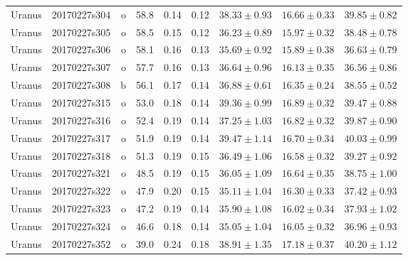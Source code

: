 \begin{table}
\begin{tabular}{|l|l|r|c|c|c|c|c|c|}
 Uranus   & 20170227s304 & o &  58.8 & 0.14 & 0.12 & $     38.33 \pm        0.93$  & $     16.66 \pm        0.33$ & $     39.85 \pm       0.82$  \\
 Uranus   & 20170227s305 & o &  58.5 & 0.15 & 0.12 & $     36.23 \pm        0.89$  & $     15.97 \pm        0.32$ & $     38.48 \pm       0.78$  \\
 Uranus   & 20170227s306 & o &  58.1 & 0.16 & 0.13 & $     35.69 \pm        0.92$  & $     15.89 \pm        0.38$ & $     36.63 \pm       0.79$  \\
 Uranus   & 20170227s307 & o & 57.7 & 0.16 & 0.13 & $     36.64 \pm        0.96$  & $     16.13 \pm        0.35$ & $     36.56 \pm       0.86$  \\
 Uranus   & 20170227s308 & b & 56.1 & 0.17 & 0.14 & $     36.88 \pm        0.61$  & $     16.35 \pm        0.24$ & $     38.55 \pm       0.52$  \\
 Uranus   & 20170227s315 & o & 53.0 & 0.18 & 0.14 & $     39.36 \pm        0.99$  & $     16.89 \pm        0.32$ & $     39.47 \pm       0.88$  \\
 Uranus   & 20170227s316 & o & 52.4 & 0.19 & 0.14 & $     37.25 \pm        1.03$  & $     16.82 \pm        0.32$ & $     39.87 \pm       0.90$  \\
 Uranus   & 20170227s317 & o & 51.9 & 0.19 & 0.14 & $     39.47 \pm        1.14$  & $     16.70 \pm        0.34$ & $     40.03 \pm       0.99$  \\
 Uranus   & 20170227s318 & o & 51.3 & 0.19 & 0.15 & $     36.49 \pm        1.06$  & $     16.58 \pm        0.32$ & $     39.27 \pm       0.92$  \\
 Uranus   & 20170227s321 & o & 48.5 & 0.19 & 0.15 & $     36.05 \pm        1.09$  & $     16.64 \pm        0.35$ & $     38.75 \pm       1.00$  \\
 Uranus   & 20170227s322 & o & 47.9 & 0.20 & 0.15 & $     35.11 \pm        1.04$  & $     16.30 \pm        0.33$ & $     37.42 \pm       0.93$  \\
 Uranus   & 20170227s323 & o & 47.2 & 0.19 & 0.14 & $     35.90 \pm        1.08$  & $     16.02 \pm        0.34$ & $     37.93 \pm       1.02$  \\
 Uranus   & 20170227s324 & o & 46.6 & 0.18 & 0.14 & $     35.05 \pm        1.04$  & $     16.05 \pm        0.32$ & $     36.96 \pm       0.93$  \\
 Uranus   & 20170227s352 & o & 39.0 & 0.24 & 0.18 & $     38.91 \pm        1.35$  & $     17.18 \pm        0.37$ & $     40.20 \pm       1.12$  \\

\end{tabular}
\end{table}
